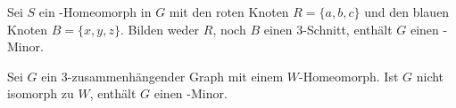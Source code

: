 \begin{lemma}\label{Lemma35}
  Sei $S$ ein \kdd-Homeomorph in $G$ mit den roten Knoten $R = \{a, b, c\}$ und den blauen Knoten $B = \{x, y, z\}$.
  Bilden weder $R$, noch $B$ einen $3$-Schnitt, enthält $G$ einen \kf-Minor.
\end{lemma}

\begin{lemma}\label{Lemma36}
  Sei $G$ ein $3$-zusammenhängender Graph mit einem $W$-Homeomorph.
  Ist $G$ nicht isomorph zu $W$, enthält $G$ einen \kf-Minor.
\end{lemma}
